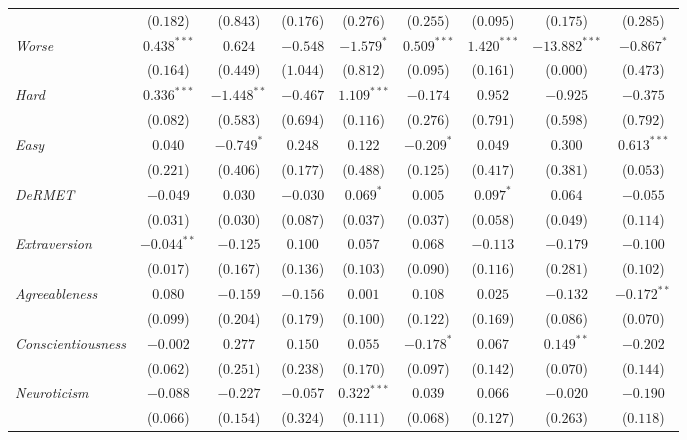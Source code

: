 \begin{table}[htpb]
\begin{tabular}{l cccc | cccc}
           & ($0.182$) & ($0.843$) & ($0.176$) & ($0.276$) & ($0.255$) & ($0.095$) & ($0.175$) & ($0.285$) \\
\textit{Worse} & $0.438^{***}$ & $0.624$ & $-0.548$ & $-1.579^{*}$ & $0.509^{***}$ & $1.420^{***}$ & $-13.882^{***}$ & $-0.867^{*}$ \\
           & ($0.164$) & ($0.449$) & ($1.044$) & ($0.812$) & ($0.095$) & ($0.161$) & ($0.000$) & ($0.473$) \\
\textit{Hard} & $0.336^{***}$ & $-1.448^{**}$ & $-0.467$ & $1.109^{***}$ & $-0.174$ & $0.952$ & $-0.925$ & $-0.375$ \\
           & ($0.082$) & ($0.583$) & ($0.694$) & ($0.116$) & ($0.276$) & ($0.791$) & ($0.598$) & ($0.792$) \\
\textit{Easy} & $0.040$ & $-0.749^{*}$ & $0.248$ & $0.122$ & $-0.209^{*}$ & $0.049$ & $0.300$ & $0.613^{***}$ \\
           & ($0.221$) & ($0.406$) & ($0.177$) & ($0.488$) & ($0.125$) & ($0.417$) & ($0.381$) & ($0.053$) \\
\textit{DeRMET} & $-0.049$ & $0.030$ & $-0.030$ & $0.069^{*}$ & $0.005$ & $0.097^{*}$ & $0.064$ & $-0.055$ \\
           & ($0.031$) & ($0.030$) & ($0.087$) & ($0.037$) & ($0.037$) & ($0.058$) & ($0.049$) & ($0.114$) \\
\textit{Extraversion} & $-0.044^{**}$ & $-0.125$ & $0.100$ & $0.057$ & $0.068$ & $-0.113$ & $-0.179$ & $-0.100$ \\
           & ($0.017$) & ($0.167$) & ($0.136$) & ($0.103$) & ($0.090$) & ($0.116$) & ($0.281$) & ($0.102$) \\
\textit{Agreeableness} & $0.080$ & $-0.159$ & $-0.156$ & $0.001$ & $0.108$ & $0.025$ & $-0.132$ & $-0.172^{**}$ \\
           & ($0.099$) & ($0.204$) & ($0.179$) & ($0.100$) & ($0.122$) & ($0.169$) & ($0.086$) & ($0.070$) \\
\textit{Conscientiousness} & $-0.002$ & $0.277$ & $0.150$ & $0.055$ & $-0.178^{*}$ & $0.067$ & $0.149^{**}$ & $-0.202$ \\
           & ($0.062$) & ($0.251$) & ($0.238$) & ($0.170$) & ($0.097$) & ($0.142$) & ($0.070$) & ($0.144$) \\
\textit{Neuroticism} & $-0.088$ & $-0.227$ & $-0.057$ & $0.322^{***}$ & $0.039$ & $0.066$ & $-0.020$ & $-0.190$ \\
           & ($0.066$) & ($0.154$) & ($0.324$) & ($0.111$) & ($0.068$) & ($0.127$) & ($0.263$) & ($0.118$) \\

\end{tabular}
\end{table}
